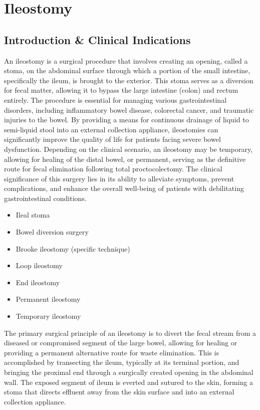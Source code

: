 \chapter{Ileostomy}

\section*{Introduction \& Clinical Indications}
An ileostomy is a surgical procedure that involves creating an opening, called a stoma, on the abdominal surface through which a portion of the small intestine, specifically the ileum, is brought to the exterior. This stoma serves as a diversion for fecal matter, allowing it to bypass the large intestine (colon) and rectum entirely. The procedure is essential for managing various gastrointestinal disorders, including inflammatory bowel disease, colorectal cancer, and traumatic injuries to the bowel. By providing a means for continuous drainage of liquid to semi-liquid stool into an external collection appliance, ileostomies can significantly improve the quality of life for patients facing severe bowel dysfunction. Depending on the clinical scenario, an ileostomy may be temporary, allowing for healing of the distal bowel, or permanent, serving as the definitive route for fecal elimination following total proctocolectomy. The clinical significance of this surgery lies in its ability to alleviate symptoms, prevent complications, and enhance the overall well-being of patients with debilitating gastrointestinal conditions.

\begin{itemize}
  \item Ileal stoma
  \item Bowel diversion surgery
  \item Brooke ileostomy (specific technique)
  \item Loop ileostomy
  \item End ileostomy
  \item Permanent ileostomy
  \item Temporary ileostomy
\end{itemize}

The primary surgical principle of an ileostomy is to divert the fecal stream from a diseased or compromised segment of the large bowel, allowing for healing or providing a permanent alternative route for waste elimination. This is accomplished by transecting the ileum, typically at its terminal portion, and bringing the proximal end through a surgically created opening in the abdominal wall. The exposed segment of ileum is everted and sutured to the skin, forming a stoma that directs effluent away from the skin surface and into an external collection appliance.

